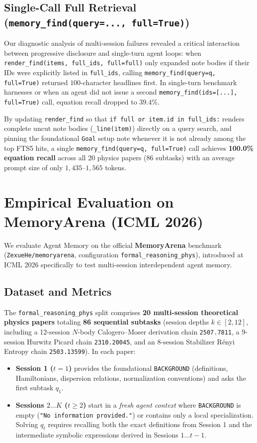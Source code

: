 \documentclass[11pt,a4paper]{article}
\begin{document}
\subsection{Single-Call Full Retrieval (\texttt{memory\_find(query=..., full=True)})}

Our diagnostic analysis of multi-session failures revealed a critical interaction between progressive disclosure and single-turn agent loops: when \texttt{render\_find(items, full\_ids, full=full)} only expanded note bodies if their IDs were explicitly listed in \texttt{full\_ids}, calling \texttt{memory\_find(query=q, full=True)} returned $100$-character headlines first. In single-turn benchmark harnesses or when an agent did not issue a second \texttt{memory\_find(ids=[...], full=True)} call, equation recall dropped to $39.4\%$.

By updating \texttt{render\_find} so that \texttt{if full or item.id in full\_ids:} renders complete uncut note bodies (\texttt{\_line(item)}) directly on a query search, and pinning the foundational \texttt{Goal} setup note whenever it is not already among the top FTS5 hits, a single \texttt{memory\_find(query=q, full=True)} call achieves \textbf{100.0\% equation recall} across all 20 physics papers ($86$ subtasks) with an average prompt size of only $1{,}435$--$1{,}565$ tokens.

\section{Empirical Evaluation on MemoryArena (ICML 2026)}

We evaluate Agent Memory on the official \textbf{MemoryArena} benchmark~\cite{he2026memoryarena} (\texttt{ZexueHe/memoryarena}, configuration \texttt{formal\_reasoning\_phys}), introduced at ICML 2026 specifically to test multi-session interdependent agent memory.

\subsection{Dataset and Metrics}
The \texttt{formal\_reasoning\_phys} split comprises \textbf{20 multi-session theoretical physics papers} totaling \textbf{86 sequential subtasks} (session depths $k \in [2, 12]$, including a 12-session $N$-body Calogero--Moser derivation chain \texttt{2507.7811}, a 9-session Hurwitz Picard chain \texttt{2310.20045}, and an 8-session Stabilizer R\'enyi Entropy chain \texttt{2503.13599}). In each paper:
\begin{itemize}[leftmargin=1.5em,itemsep=1pt]
    \item \textbf{Session 1 ($t=1$)} provides the foundational \texttt{BACKGROUND} (definitions, Hamiltonians, dispersion relations, normalization conventions) and asks the first subtask $q_1$.
    \item \textbf{Sessions $2\dots K$ ($t \ge 2$)} start in a \emph{fresh agent context} where \texttt{BACKGROUND} is empty (\texttt{"No information provided."}) or contains only a local specialization. Solving $q_t$ requires recalling both the exact definitions from Session 1 and the intermediate symbolic expressions derived in Sessions $1\dots t-1$.
\end{itemize}
\end{document}
